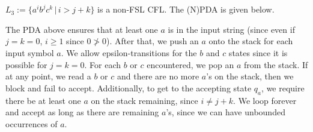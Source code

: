\documentclass{article}
\begin{document}
\newpage

\section{}
$L_3 := \{a^ib^jc^k \,|\, i > j + k\}$ is a non-FSL CFL. The (N)PDA is given below.

\begin{center}
\end{center}

\noindent
The PDA above ensures that at least one $a$ is in the input string (since even if $j = k = 0$, $i \geq 1$ since $0 \not> 0$). After that, we push an $a$ onto the stack for each input symbol $a$. We allow epsilon-transitions for the $b$ and $c$ states since it is possible for $j = k = 0$. For each $b$ or $c$ encountered, we pop an $a$ from the stack. If at any point, we read a $b$ or $c$ and there are no more $a$'s on the stack, then we block and fail to accept. Additionally, to get to the accepting state $q_a$, we require there be at least one $a$ on the stack remaining, since $i \neq j + k$. We loop forever and accept as long as there are remaining $a$'s, since we can have unbounded occurrences of $a$.
\end{document}
